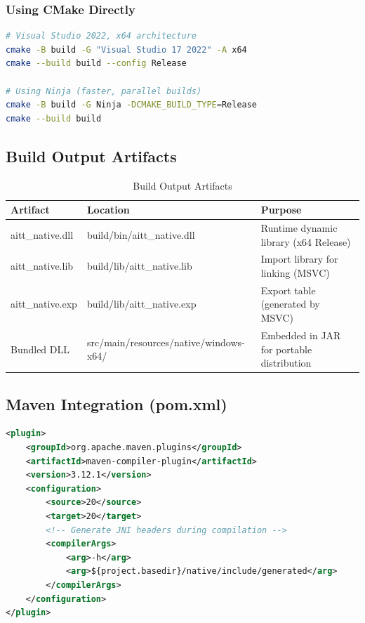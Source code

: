 \documentclass[12pt,a4paper]{article}
\begin{document}
\subsubsection{Using CMake Directly}

\begin{lstlisting}[language=bash, caption=CMake Build Commands]
# Visual Studio 2022, x64 architecture
cmake -B build -G "Visual Studio 17 2022" -A x64
cmake --build build --config Release

# Using Ninja (faster, parallel builds)
cmake -B build -G Ninja -DCMAKE_BUILD_TYPE=Release
cmake --build build
\end{lstlisting}

\subsection{Build Output Artifacts}

\begin{table}[h]
\centering
\begin{tabular}{|p{3cm}|p{3.5cm}|p{6cm}|}
\hline
\textbf{Artifact} & \textbf{Location} & \textbf{Purpose} \\
\hline
aitt\_native.dll & build/bin/aitt\_native.dll & Runtime dynamic library (x64 Release) \\
\hline
aitt\_native.lib & build/lib/aitt\_native.lib & Import library for linking (MSVC) \\
\hline
aitt\_native.exp & build/lib/aitt\_native.exp & Export table (generated by MSVC) \\
\hline
Bundled DLL & src/main/resources/native/windows-x64/ & Embedded in JAR for portable distribution \\
\hline
\end{tabular}
\caption{Build Output Artifacts}
\end{table}

\subsection{Maven Integration (pom.xml)}

\begin{lstlisting}[language=xml, caption=Maven Compiler Plugin Configuration]
<plugin>
    <groupId>org.apache.maven.plugins</groupId>
    <artifactId>maven-compiler-plugin</artifactId>
    <version>3.12.1</version>
    <configuration>
        <source>20</source>
        <target>20</target>
        <!-- Generate JNI headers during compilation -->
        <compilerArgs>
            <arg>-h</arg>
            <arg>${project.basedir}/native/include/generated</arg>
        </compilerArgs>
    </configuration>
</plugin>
\end{lstlisting}
\end{document}
